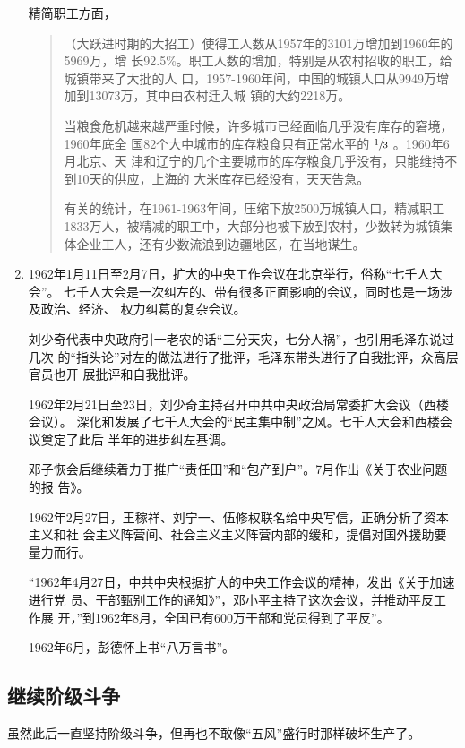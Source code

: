 \begin{enumerate}
  精简职工方面，
  \begin{quotation}
    （大跃进时期的大招工）使得工人数从1957年的3101万增加到1960年的5969万，增
    长92.5\%。职工人数的增加，特别是从农村招收的职工，给城镇带来了大批的人
    口，1957-1960年间，中国的城镇人口从9949万增加到13073万，其中由农村迁入城
    镇的大约2218万。

    当粮食危机越来越严重时候，许多城市已经面临几乎没有库存的窘境，1960年底全
    国82个大中城市的库存粮食只有正常水平的 $\sfrac{1}{3}$ 。1960年6月北京、天
    津和辽宁的几个主要城市的库存粮食几乎没有，只能维持不到10天的供应，上海的
    大米库存已经没有，天天告急。

    有关的统计，在1961-1963年间，压缩下放2500万城镇人口，精减职工1833万人，被精减的职工中，大部分也被下放到农村，少数转为城镇集体企业工人，还有少数流浪到边疆地区，在当地谋生。\cite{jingjianzhigong}
  \end{quotation}

\item 1962年1月11日至2月7日，扩大的中央工作会议在北京举行，俗称“七千人大会”。
  七千人大会是一次纠左的、带有很多正面影响的会议，同时也是一场涉及政治、经济、
  权力纠葛的复杂会议。

  刘少奇代表中央政府引一老农的话“三分天灾，七分人祸”，也引用毛泽东说过几次
  的“指头论”对左的做法进行了批评，毛泽东带头进行了自我批评，众高层官员也开
  展批评和自我批评。

  1962年2月21日至23日，刘少奇主持召开中共中央政治局常委扩大会议（西楼会议）。
  深化和发展了七千人大会的“民主集中制”之风。七千人大会和西楼会议奠定了此后
  半年的进步纠左基调。

  邓子恢会后继续着力于推广“责任田”和“包产到户”。7月作出《关于农业问题的报
  告》。

  1962年2月27日，王稼祥、刘宁一、伍修权联名给中央写信，正确分析了资本主义和社
  会主义阵营间、社会主义主义阵营内部的缓和，提倡对国外援助要量力而行。

  “1962年4月27日，中共中央根据扩大的中央工作会议的精神，发出《关于加速进行党
  员、干部甄别工作的通知》”，邓小平主持了这次会议，并推动平反工作展
  开，”到1962年8月，全国已有600万干部和党员得到了平反”。

  1962年6月，彭德怀上书“八万言书”。
\end{enumerate}

\subsection{继续阶级斗争}

虽然此后一直坚持阶级斗争，但再也不敢像“五风”盛行时那样破坏生产了。

